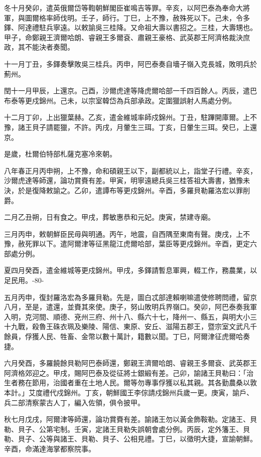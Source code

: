\begin{pinyinscope}
冬十月癸卯，遣英俄爾岱等鞫朝鮮閣臣崔鳴吉等罪。辛亥，以阿巴泰為奉命大將軍，與圖爾格率師伐明。壬子，師行。丁巳，上不豫，赦殊死以下。己未，令多鐸、阿達禮駐兵寧遠。以敕諭吳三桂降。又命祖大壽以書招之。三桂，大壽甥也。甲子，命鄭親王濟爾哈朗、睿親王多爾袞、肅親王豪格、武英郡王阿濟格裁決庶政，其不能決者奏聞。

十一月丁丑，多鐸奏擊敗吳三桂兵。丙申，阿巴泰奏自墻子嶺入克長城，敗明兵於薊州。

閏十一月甲辰，上還京。己酉，沙爾虎達等降虎爾哈部一千四百餘人。丙辰，遣巴布泰等更戍錦州。己未，以宗室韓岱為兵部承政。定圍獵誤射人馬處分例。

十二月丁卯，上出獵葉赫。乙亥，遣金維城率師戍錦州。丁丑，駐蹕開庫爾。上不豫，諸王貝子請罷獵，不許。丙戌，月暈生三珥。丁亥，日暈生三珥。癸巳，上還京。

是歲，杜爾伯特部札薩克塞冷來朝。

八年春正月丙申朔，上不豫，命和碩親王以下，副都統以上，詣堂子行禮。辛亥，沙爾虎達等師還，論功賞賚有差。甲寅，明寧遠總兵吳三桂答祖大壽書，猶豫未決，於是復降敕諭之。乙卯，遣譚布等更戍錦州。辛酉，多羅貝勒羅洛宏以罪削爵。

二月乙丑朔，日有食之。甲戌，葬敏惠恭和元妃。庚寅，禁建寺廟。

三月丙申，敕朝鮮臣民毋與明通。丙午，地震，自西隅至東南有聲。庚戌，上不豫，赦死罪以下。遣阿爾津等征黑龍江虎爾哈部，葉臣等更戍錦州。辛酉，更定六部處分例。

夏四月癸酉，遣金維城等更戍錦州。甲戌，多鐸請暫息軍興，輟工作，務農業，以足民用。-80-

五月丙申，復封羅洛宏為多羅貝勒。先是，圖白忒部達賴喇嘛遣使修聘問禮，留京八月，至是，遣還，並賚其來使。庚子，努山敗明兵界嶺口。癸卯，阿巴泰奏我軍入明，克河間、順德、兗州三府、州十八、縣六十七，降州一、縣五，與明大小三十九戰，殺魯王硃衣珮及樂陵、陽信、東原、安丘、滋陽五郡王，暨宗室文武凡千餘員，俘獲人民、牲畜、金幣以數十萬計，籍數以聞。丁巳，阿爾津征虎爾哈奏捷。

六月癸酉，多羅饒餘貝勒阿巴泰師還，鄭親王濟爾哈朗、睿親王多爾袞、武英郡王阿濟格郊迎之。甲戌，賜阿巴泰及從征將士銀緞有差。己卯，諭諸王貝勒曰：「治生者務在節用，治國者重在土地人民。爾等勿專事俘獲以私其親。其各勤農桑以敦本計。」艾度禮代戍錦州。丁亥，朝鮮國王李倧請戍錦州兵歲一更。庚寅，諭戶、兵二部清察蒙古人丁，編入佐領，俱令披甲。

秋七月戊戌，阿爾津等師還，論功賞賚有差。諭諸王勿以黃金飾鞍勒。定諸王、貝勒、貝子、公第宅制。壬寅，定諸王貝勒失誤朝會處分例。丙辰，定外籓王、貝勒、貝子、公等與諸王、貝勒、貝子、公相見禮。丁巳，以徵明大捷，宣諭朝鮮。辛酉，命滿達海掌都察院事。


\end{pinyinscope}

